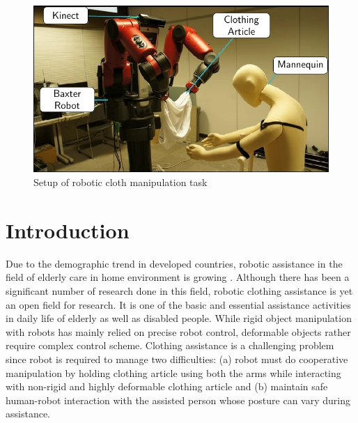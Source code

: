 \documentclass[sigconf]{acmart}
\begin{document}


\maketitle

\begin{figure}
	\includegraphics[width=\linewidth]{setup}
	\caption{Setup of robotic cloth manipulation task}
	\label{fig:setup}
\end{figure}

\section{Introduction}
\label{sec:introduction}
Due to the demographic trend in developed countries, robotic assistance in the field of elderly care in home environment is growing \cite{broekens2009assistive}. Although there has been a significant number of research done in this field, robotic clothing assistance is yet an open field for research. It is one of the basic and essential assistance activities in daily life of elderly as well as disabled people. While rigid object manipulation with robots has mainly relied on precise robot control, deformable objects rather require complex control scheme. Clothing assistance is a challenging problem since robot is required to manage two difficulties: (a) robot must do cooperative manipulation by holding clothing article using both the arms while interacting with non-rigid and highly deformable clothing article and (b) maintain safe human-robot interaction with the assisted person whose posture can vary during assistance.
\end{document}

